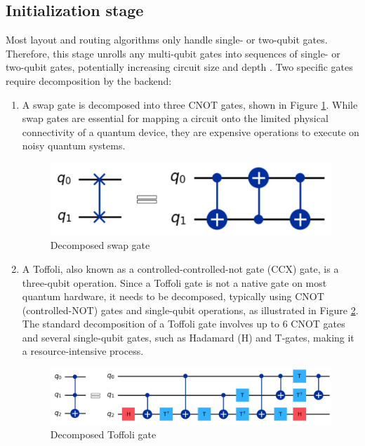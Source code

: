\subsection{Initialization stage} %
Most layout and routing algorithms only handle single- or two-qubit gates. Therefore, this stage unrolls any multi-qubit gates into sequences of single- or two-qubit gates, potentially increasing circuit size and depth \cite{ding_circuit_2020}. Two specific gates require decomposition by the backend:
\begin{enumerate}[nolistsep]
    \item A swap gate is decomposed into three CNOT gates, shown in Figure \ref{fig:swap-decompose}. While swap gates are essential for mapping a circuit onto the limited physical connectivity of a quantum device, they are expensive operations to execute on noisy quantum systems.
    \begin{figure}[h]
        \centering
        \includegraphics[width=0.5\linewidth]{image/swap decompose.png}
        \caption{Decomposed swap gate}
        \label{fig:swap-decompose}
    \end{figure}

    \item A Toffoli, also known as a controlled-controlled-not gate (CCX) gate, is a three-qubit operation. Since a Toffoli gate is not a native gate on most quantum hardware, it needs to be decomposed, typically using CNOT (controlled-NOT) gates and single-qubit operations, as illustrated in Figure \ref{fig:toffoli-decompose}. The standard decomposition of a Toffoli gate involves up to 6 CNOT gates and several single-qubit gates, such as Hadamard (H) and T-gates, making it a resource-intensive process.
    \begin{figure}[h]
        \centering
        \includegraphics[width=0.5\linewidth]{image/toffoli decompose.png}
        \caption{Decomposed Toffoli gate}
        \label{fig:toffoli-decompose}
    \end{figure}
\end{enumerate}

